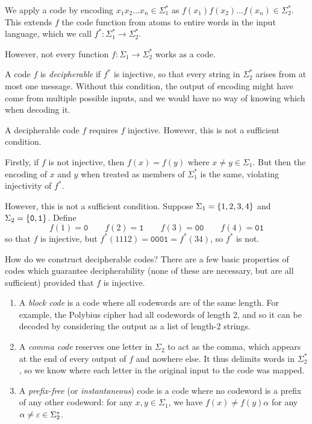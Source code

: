 \documentclass{article}
\begin{document}
We apply a code by encoding
$x_1x_2\dots x_n \in \Sigma_1^*$ as
$f(x_1)f(x_2)\dots f(x_n) \in \Sigma_2^*$.
This extends $f$ the code function
from atoms to entire words in the input language,
which we call $f^*: \Sigma_1^* \to \Sigma_2^*$.

However, not every function $f: \Sigma_1 \to \Sigma_2^*$ works as a code.

\begin{definition}[Decipherable]
	\label{decipherable-definition}
    A code $f$ is \textit{decipherable} if $f^*$ is injective,
    so that every string in $\Sigma_2^*$ arises from at most one message.
    Without this condition, the output of encoding
    might have come from multiple possible inputs,
    and we would have no way of knowing which when decoding it.
\end{definition}

\begin{proposition}
	\label{decipherability-requires-injectivity}
	A decipherable code $f$ requires $f$ injective.
	However, this is not a sufficient condition.
\end{proposition}

\begin{prf}
    Firstly, if $f$ is not injective,
    then $f(x) = f(y)$ where $x \neq y \in \Sigma_1$.
    But then the encoding of $x$ and $y$
    when treated as members of $\Sigma_1^*$ is the same,
    violating injectivity of $f^*$.
    
    However, this is not a sufficient condition.
    Suppose $\Sigma_1 = \left\lbrace 1, 2, 3, 4 \right\rbrace$ and $\Sigma_2 = \left\lbrace \texttt{0}, \texttt{1} \right\rbrace$.
    Define
    \[
	f(1) = \texttt{0}
	\qquad
	f(2) = \texttt{1}
	\qquad
	f(3) = \texttt{00}
	\qquad
	f(4) = \texttt{01}
	\]
	so that $f$ is injective,
	but $f^*(1112) = \texttt{0001} = f^*(34)$,
	so $f^*$ is not.
\end{prf}

How do we construct decipherable codes?
There are a few basic properties of codes which guarantee decipherability
(none of these are necessary, but are all sufficient)
provided that $f$ is injective.

\begin{enumerate}
    \item A \textit{block code} is a code where all codewords are of the same length. For example, the Polybius cipher had all codewords of length 2, and so it can be decoded by considering the output as a list of length-2 strings.
    \item A \textit{comma code} reserves one letter in $\Sigma_2$ to act as the comma, which appears at the end of every output of $f$ and nowhere else. It thus delimits words in $\Sigma_2^*$, so we know where each letter in the original input to the code was mapped.
    \item A \textit{prefix-free} (or \textit{instantaneous}) code is a code where no codeword is a prefix of any other codeword: for any $x, y \in \Sigma_1$, we have $f(x) \neq f(y)\alpha$ for any $\alpha \neq \varepsilon \in \Sigma_2^*$.
\end{enumerate}
\end{document}
